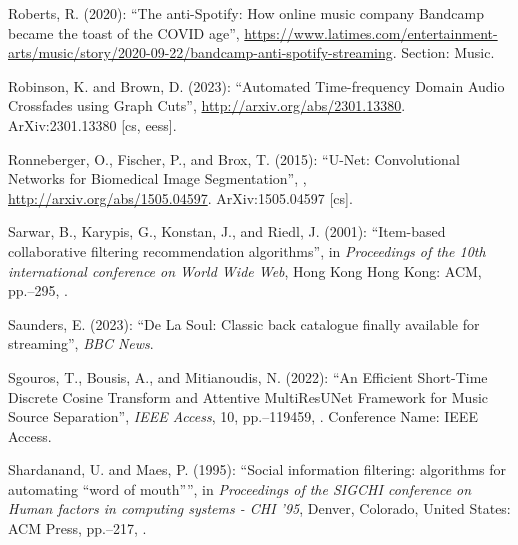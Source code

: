 \documentclass[11pt,titlepage,oneside]{book}
\begin{document}
\begin{thebibliography}{97}
	Roberts, R. (2020): \enquote{The anti-{Spotify}: {How} online music company
		{Bandcamp} became the toast of the {COVID} age},
	\urlprefix\url{https://www.latimes.com/entertainment-arts/music/story/2020-09-22/bandcamp-anti-spotify-streaming}.
	Section: Music.
	
	Robinson, K. and Brown, D. (2023): \enquote{Automated {Time}-frequency {Domain}
		{Audio} {Crossfades} using {Graph} {Cuts}},
	\urlprefix\url{http://arxiv.org/abs/2301.13380}. ArXiv:2301.13380 [cs, eess].
	
	Ronneberger, O., Fischer, P., and Brox, T. (2015): \enquote{U-{Net}:
		{Convolutional} {Networks} for {Biomedical} {Image} {Segmentation}},
	,
	\urlprefix\url{http://arxiv.org/abs/1505.04597}. ArXiv:1505.04597 [cs].
	
	Sarwar, B., Karypis, G., Konstan, J., and Riedl, J. (2001): \enquote{Item-based
		collaborative filtering recommendation algorithms}, in \textit{Proceedings of
		the 10th international conference on {World} {Wide} {Web}}, Hong Kong Hong
	Kong: ACM, pp.--295, .
	
	Saunders, E. (2023): \enquote{De {La} {Soul}: {Classic} back catalogue finally
		available for streaming}, \textit{BBC News}.
	
	Sgouros, T., Bousis, A., and Mitianoudis, N. (2022): \enquote{An {Efficient}
		{Short}-{Time} {Discrete} {Cosine} {Transform} and {Attentive} {MultiResUNet}
		{Framework} for {Music} {Source} {Separation}}, \textit{IEEE Access}, 10,
	pp.--119459, .
	Conference Name: IEEE Access.
	
	Shardanand, U. and Maes, P. (1995): \enquote{Social information filtering:
		algorithms for automating “word of mouth”}, in \textit{Proceedings of the
		{SIGCHI} conference on {Human} factors in computing systems - {CHI} '95},
	Denver, Colorado, United States: ACM Press, pp.--217,
	.
	

\end{thebibliography}
\end{document}
